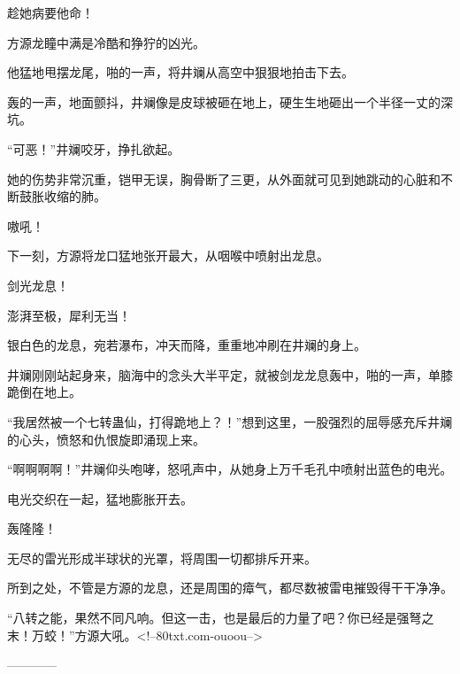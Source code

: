 \begin{this_body}
趁她病要他命！

方源龙瞳中满是冷酷和狰狞的凶光。

他猛地甩摆龙尾，啪的一声，将井斓从高空中狠狠地拍击下去。

轰的一声，地面颤抖，井斓像是皮球被砸在地上，硬生生地砸出一个半径一丈的深坑。

“可恶！”井斓咬牙，挣扎欲起。

她的伤势非常沉重，铠甲无误，胸骨断了三更，从外面就可见到她跳动的心脏和不断鼓胀收缩的肺。

嗷吼！

下一刻，方源将龙口猛地张开最大，从咽喉中喷射出龙息。

剑光龙息！

澎湃至极，犀利无当！

银白色的龙息，宛若瀑布，冲天而降，重重地冲刷在井斓的身上。

井斓刚刚站起身来，脑海中的念头大半平定，就被剑龙龙息轰中，啪的一声，单膝跪倒在地上。

“我居然被一个七转蛊仙，打得跪地上？！”想到这里，一股强烈的屈辱感充斥井斓的心头，愤怒和仇恨旋即涌现上来。

“啊啊啊啊！”井斓仰头咆哮，怒吼声中，从她身上万千毛孔中喷射出蓝色的电光。

电光交织在一起，猛地膨胀开去。

轰隆隆！

无尽的雷光形成半球状的光罩，将周围一切都排斥开来。

所到之处，不管是方源的龙息，还是周围的瘴气，都尽数被雷电摧毁得干干净净。

“八转之能，果然不同凡响。但这一击，也是最后的力量了吧？你已经是强弩之末！万蛟！”方源大吼。<!--80txt.com-ouoou-->

------------

\end{this_body}

